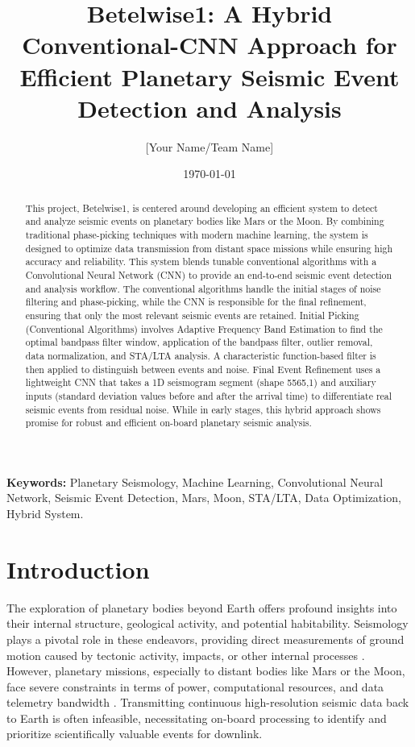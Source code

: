 \documentclass[11pt,a4paper]{article}
\title{\textbf{Betelwise1: A Hybrid Conventional-CNN Approach for Efficient Planetary Seismic Event Detection and Analysis}}
\author[1]{[Your Name/Team Name]} %
\affil[1]{[Your Affiliation/University]} %
\date{\today}
\begin{document}
\maketitle

\begin{abstract}
This project, Betelwise1, is centered around developing an efficient system to detect and analyze seismic events on planetary bodies like Mars or the Moon. By combining traditional phase-picking techniques with modern machine learning, the system is designed to optimize data transmission from distant space missions while ensuring high accuracy and reliability. This system blends tunable conventional algorithms with a Convolutional Neural Network (CNN) to provide an end-to-end seismic event detection and analysis workflow. The conventional algorithms handle the initial stages of noise filtering and phase-picking, while the CNN is responsible for the final refinement, ensuring that only the most relevant seismic events are retained. Initial Picking (Conventional Algorithms) involves Adaptive Frequency Band Estimation to find the optimal bandpass filter window, application of the bandpass filter, outlier removal, data normalization, and STA/LTA analysis. A characteristic function-based filter is then applied to distinguish between events and noise. Final Event Refinement uses a lightweight CNN that takes a 1D seismogram segment (shape 5565,1) and auxiliary inputs (standard deviation values before and after the arrival time) to differentiate real seismic events from residual noise. While in early stages, this hybrid approach shows promise for robust and efficient on-board planetary seismic analysis.
\end{abstract}

\noindent\textbf{Keywords:} Planetary Seismology, Machine Learning, Convolutional Neural Network, Seismic Event Detection, Mars, Moon, STA/LTA, Data Optimization, Hybrid System.

\section{Introduction}
The exploration of planetary bodies beyond Earth offers profound insights into their internal structure, geological activity, and potential habitability. Seismology plays a pivotal role in these endeavors, providing direct measurements of ground motion caused by tectonic activity, impacts, or other internal processes \citep{lognonne2005planetary, giardini2020seismicity}. However, planetary missions, especially to distant bodies like Mars or the Moon, face severe constraints in terms of power, computational resources, and data telemetry bandwidth \citep{lorenz2015energy, lognonne2019seis}. Transmitting continuous high-resolution seismic data back to Earth is often infeasible, necessitating on-board processing to identify and prioritize scientifically valuable events for downlink.
\end{document}
